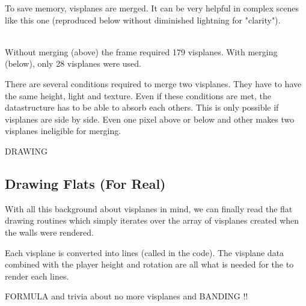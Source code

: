 \label{complex_scene_plain_light.png}
To save memory, visplanes are merged. It can be very helpful in complex scenes like this one (reproduced below without diminished lightning for "clarity").\\



\\
Without merging (above) the frame required 179 visplanes. With merging (below), only 28 visplanes were used.\\ 



There are several conditions required to merge two visplanes. They have to have the same height, light and texture. Even if these conditions are met, the datastructure has to be able to absorb each others. This is only possible if visplanes are side by side. Even one pixel above or below and other makes two visplanes ineligible for merging.\\
\par
{}
\par
DRAWING\\
\vspace{4cm}
\par

\subsection{Drawing Flats (For Real)}

With all this background about visplanes in mind, we can finally read the flat drawing routines which simply iterates over the array of visplanes created when the walls were rendered.\\
\par
Each visplane is converted into lines (called  in the code). The visplane data combined with the player height and rotation are all what is needed for the  to render each lines.\\
\par
{}
\par
FORMULA and trivia about no more visplanes and BANDING !!\\
\vspace{4cm}
\par


